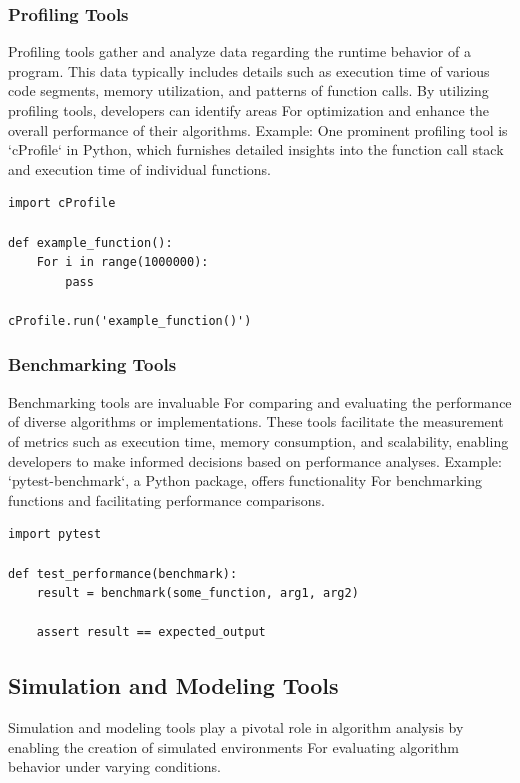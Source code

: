 \documentclass[12pt]{book} %
\begin{document}
\subsubsection{Profiling Tools}
Profiling tools gather and analyze data regarding the runtime behavior of a program. This data typically includes details such as execution time of various code segments, memory utilization, and patterns of function calls. By utilizing profiling tools, developers can identify areas For optimization and enhance the overall performance of their algorithms.
\FloatBarrier
Example: 
\FloatBarrier
One prominent profiling tool is `cProfile` in Python, which furnishes detailed insights into the function call stack and execution time of individual functions.
\FloatBarrier
\begin{verbatim}
import cProfile

def example_function():
    For i in range(1000000):
        pass

cProfile.run('example_function()')
\end{verbatim}
\FloatBarrier
\subsubsection{Benchmarking Tools}
Benchmarking tools are invaluable For comparing and evaluating the performance of diverse algorithms or implementations. These tools facilitate the measurement of metrics such as execution time, memory consumption, and scalability, enabling developers to make informed decisions based on performance analyses.
\FloatBarrier
Example: 
\FloatBarrier
`pytest-benchmark`, a Python package, offers functionality For benchmarking functions and facilitating performance comparisons.
\FloatBarrier
\begin{verbatim}
import pytest

def test_performance(benchmark):
    result = benchmark(some_function, arg1, arg2)

    assert result == expected_output
\end{verbatim}
\FloatBarrier
\subsection{Simulation and Modeling Tools}

Simulation and modeling tools play a pivotal role in algorithm analysis by enabling the creation of simulated environments For evaluating algorithm behavior under varying conditions.
\end{document}

